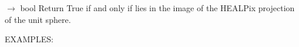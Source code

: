\documentclass[a4paper,12ptopenany,oneside,english]{sphinxmanual}
\begin{document}

\begin{fulllineitems}
\label{\detokenize{pj_healpix:rhealpixdggs.pj_healpix.in_healpix_image}}
\pysigstartsignatures
\pysiglinewithargsret
{}
{\sphinxparamcomma {}}
{{ $\rightarrow$ bool}}
\pysigstopsignatures
\sphinxAtStartPar
Return True if and only if  lies in the image of the HEALPix
projection of the unit sphere.

\sphinxAtStartPar
EXAMPLES:


\end{fulllineitems}
\end{document}
